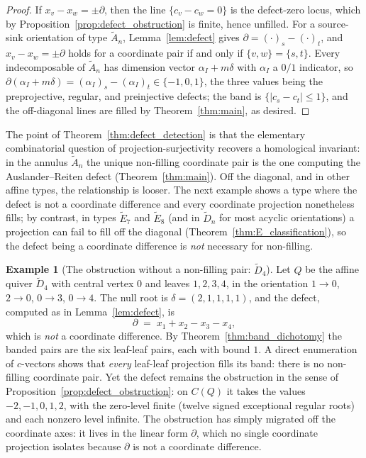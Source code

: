 \documentclass[11pt, a4paper]{amsart}
\theoremstyle{definition}
\newtheorem{example}[theorem]{Example}
\begin{document}
\begin{proof}
If $x_v - x_w = \pm\partial$, then the line $\{c_v - c_w = 0\}$ is the
defect-zero locus, which by Proposition~\ref{prop:defect_obstruction} is
finite, hence unfilled. For a source-sink orientation of type $\widetilde{A}_n$,
Lemma~\ref{lem:defect} gives $\partial = (\cdot)_s - (\cdot)_t$, and
$x_v - x_w = \pm\partial$ holds for a coordinate pair if and only if
$\{v, w\} = \{s, t\}$. Every indecomposable of $\widetilde{A}_n$ has
dimension vector $\alpha_I + m\delta$ with $\alpha_I$ a $0/1$ indicator,
so $\partial(\alpha_I + m\delta) = (\alpha_I)_s - (\alpha_I)_t \in
\{-1, 0, 1\}$, the three values being the preprojective, regular, and
preinjective defects; the band is $\{|c_s - c_t| \leq 1\}$, and the
off-diagonal lines are filled by Theorem~\ref{thm:main}, as desired.
\end{proof}

The point of Theorem~\ref{thm:defect_detection} is that the elementary
combinatorial question of projection-surjectivity recovers a homological
invariant: in the annulus $\widetilde{A}_n$ the unique non-filling
coordinate pair is the one computing the Auslander--Reiten defect
(Theorem~\ref{thm:main}). Off the diagonal, and in other affine types, the
relationship is looser. The next example shows a type where the defect is
not a coordinate difference and every coordinate projection nonetheless
fills; by contrast, in types $\widetilde{E}_7$ and $\widetilde{E}_8$ (and
in $\widetilde{D}_n$ for most acyclic orientations) a projection can fail to fill off the
diagonal (Theorem~\ref{thm:E_classification}), so the defect being a
coordinate difference is \emph{not} necessary for non-filling.

\begin{example}[The obstruction without a non-filling pair: $\widetilde{D}_4$]
\label{ex:D4_meaning}
Let $Q$ be the affine quiver $\widetilde{D}_4$ with central vertex $0$ and
leaves $1, 2, 3, 4$, in the orientation $1 \to 0$, $2 \to 0$, $0 \to 3$,
$0 \to 4$. The null root is $\delta = (2, 1, 1, 1, 1)$, and the defect,
computed as in Lemma~\ref{lem:defect}, is
\[
  \partial \;=\; x_1 + x_2 - x_3 - x_4,
\]
which is \emph{not} a coordinate difference. By
Theorem~\ref{thm:band_dichotomy} the banded pairs are the six leaf-leaf
pairs, each with bound $1$. A direct enumeration of $c$-vectors shows that
\emph{every} leaf-leaf projection fills its band: there is no non-filling
coordinate pair. Yet the defect remains the obstruction in the sense of
Proposition~\ref{prop:defect_obstruction}: on $C(Q)$ it takes the values
$-2, -1, 0, 1, 2$, with the zero-level finite \textup{(}twelve signed
exceptional regular roots\textup{)} and each nonzero level infinite. The
obstruction has simply migrated off the coordinate axes: it lives in the
linear form $\partial$, which no single coordinate projection isolates
because $\partial$ is not a coordinate difference.
\end{example}
\end{document}
